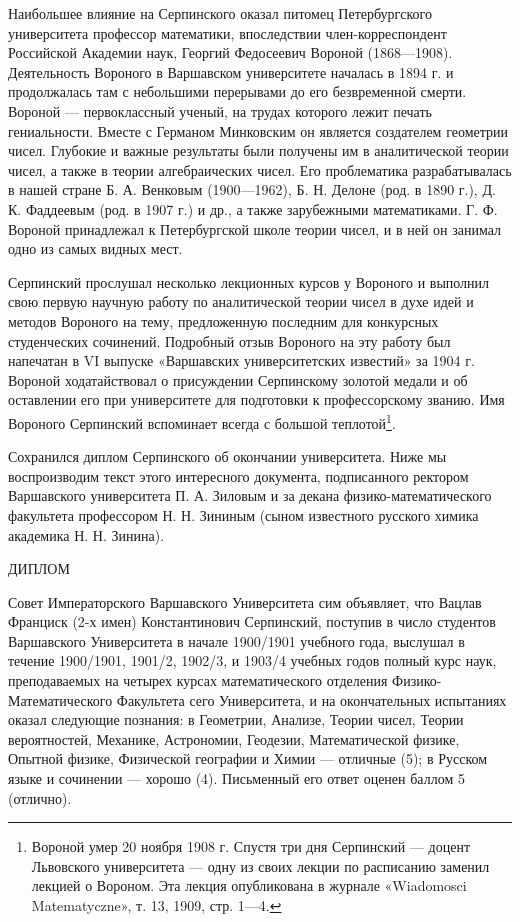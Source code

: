 \documentclass[12pt, a4paper, openany]{book}
\begin{document}
	
	Наибольшее влияние на Серпинского оказал питомец Петербургского университета профессор математики, впоследствии член-корреспондент Российской Академии наук, Георгий Федосеевич Вороной (1868—1908). Деятельность Вороного в Варшавском университете началась в 1894 г. и продолжалась там с небольшими перерывами до его безвременной смерти. Вороной — первоклассный ученый, на трудах которого лежит печать гениальности. Вместе с Германом Минковским он является создателем геометрии чисел. Глубокие и важные результаты были получены им в аналитической теории чисел, а также в теории алгебраических чисел. Его проблематика разрабатывалась в нашей стране Б. А. Венковым (1900—1962), Б. Н. Делоне (род. в 1890 г.), Д. К. Фаддеевым (род. в 1907 г.) и др., а также зарубежными математиками. Г. Ф. Вороной принадлежал к Петербургской школе теории чисел, и в ней он занимал одно из самых видных мест.
	
	Серпинский прослушал несколько лекционных курсов у Вороного и выполнил свою первую научную работу по аналитической теории чисел в духе идей и методов Вороного на тему, предложенную последним для конкурсных студенческих сочинений. Подробный отзыв Вороного на эту работу был напечатан в VI выпуске «Варшавских университетских известий» за 1904 г. Вороной ходатайствовал о присуждении Серпинскому золотой медали и об оставлении его при университете для подготовки к профессорскому званию. Имя Вороного Серпинский вспоминает всегда с большой теплотой\footnote{Вороной умер 20 ноября 1908 г. Спустя три дня Серпинский — доцент Львовского университета — одну из своих лекции по расписанию заменил лекцией о Вороном. Эта лекция опубликована в журнале «Wiadomosci Matematyczne», т. 13, 1909, стр. 1—4.}.
	
	Сохранился диплом Серпинского об окончании университета. Ниже мы воспроизводим текст этого интересного документа, подписанного ректором Варшавского университета П. А. Зиловым и за декана физико-математического факультета профессором Н. Н. Зининым (сыном известного русского химика академика Н. Н. Зинина).
	

	
	\begin{center}
	ДИПЛОМ
	\end{center}
	
\hangindent=1.5cm   Совет Императорского Варшавского Университета сим объявляет, что Вацлав Франциск (2-х имен) Константинович Серпинский, поступив в число студентов Варшавского Университета в начале 1900/1901 учебного года, выслушал в течение 1900/1901, 1901/2, 1902/3, и 1903/4 учебных годов полный курс наук, преподаваемых на четырех курсах математического отделения Физико-Математического Факультета сего Университета, и на окончательных испытаниях оказал следующие познания: в Геометрии, Анализе, Теории чисел, Теории вероятностей, Механике, Астрономии, Геодезии, Математической физике, Опытной физике, Физической географии и Химии — отличные (5); в Русском языке и сочинении — хорошо (4). Письменный его ответ оценен баллом 5 (отлично).
\end{document}
